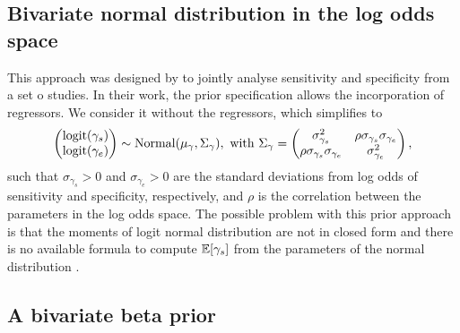 \subsection{Bivariate normal distribution in the log odds space}

This approach was designed by \textcite{chu2006bivariate} to jointly analyse
sensitivity and specificity from a set o studies. In their work, the prior
specification allows the incorporation of regressors. We consider it without
the regressors, which simplifies to
\begin{equation*}
  \begin{pmatrix}
    \operatorname{logit}(\gamma_s) \\
    \operatorname{logit}(\gamma_e)
  \end{pmatrix}
  \sim \operatorname{Normal}(\mu_{\gamma}, \Sigma_{\gamma}), \text{ with } \Sigma_{\gamma} =
  \begin{pmatrix}
    \sigma_{\gamma_s}^2                    & \rho\sigma_{\gamma_s}\sigma_{\gamma_e} \\
    \rho\sigma_{\gamma_s}\sigma_{\gamma_e} & \sigma_{\gamma_e}^2
  \end{pmatrix},
\end{equation*}
such that $\sigma_{\gamma_s} > 0$ and $\sigma_{\gamma_e} > 0$ are the
standard deviations from log odds of sensitivity and specificity,
respectively, and $\rho$ is the correlation between the parameters in the log
odds space. The possible problem with this prior approach is that the moments
of logit normal distribution are not in closed form and there is no available
formula to compute $\mathbb{E}[\gamma_s]$ from the parameters of the normal
distribution \cite{kurt2021logit}.

\subsection{A bivariate beta prior}

